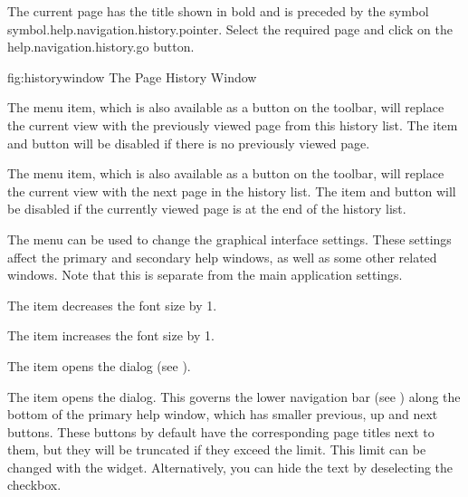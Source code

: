 The current page has the title shown in bold and is preceded by
the symbol \gls{symbol.help.navigation.history.pointer}.
Select the required page and click on the
\gls{help.navigation.history.go} button.

\FloatFig
 {fig:historywindow}
 {%
 }
 {The Page History Window}


The  menu item, which is
also available as a button on the toolbar, will replace the current
view with the previously viewed page from this history list. The
item and button will be disabled if there is no previously viewed
page. 


The  menu item, which is
also available as a button on the toolbar, will replace the current view with the
next page in the history list. The item and button will be disabled if the
currently viewed page is at the end of the history list. 


The  menu can be used to change the
graphical interface settings. These settings affect the primary and
secondary help windows, as well as some other related windows.
Note that this is separate from the main application settings.


The  item decreases the font
size by 1.


The  item increases the font
size by 1.


The  item opens the
 dialog (see
).


The  item opens the
 dialog. This governs the
lower navigation bar (see ) along the
bottom of the primary help window, which has smaller previous, up and next
buttons.  These buttons by default have the corresponding page
titles next to them, but they will be truncated if they exceed the
limit. This limit can be changed with the
 widget. Alternatively, you
can hide the text by deselecting the
 checkbox.

